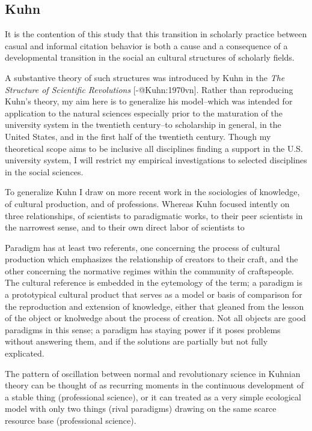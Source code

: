 \documentclass [PhD] {uclathes}
\begin{document}
\subsection{Kuhn}\label{kuhn}

It is the contention of this study that this transition in scholarly
practice between casual and informal citation behavior is both a cause
and a consequence of a developmental transition in the social an
cultural structures of scholarly fields.

A substantive theory of such structures was introduced by Kuhn in the
\emph{The Structure of Scientific Revolutions} {[}-@Kuhn:1970vn{]}.
Rather than reproducing Kuhn's theory, my aim here is to generalize his
model--which was intended for application to the natural sciences
especially prior to the maturation of the university system in the
twentieth century--to scholarship in general, in the United States, and
in the first half of the twentieth century. Though my theoretical scope
aims to be inclusive all disciplines finding a support in the U.S.
university system, I will restrict my empirical investigations to
selected disciplines in the social sciences.

To generalize Kuhn I draw on more recent work in the sociologies of
knowledge, of cultural production, and of professions. Whereas Kuhn
focused intently on three relationships, of scientists to paradigmatic
works, to their peer scientists in the narrowest sense, and to their own
direct labor of scientists to

Paradigm has at least two referents, one concerning the process of
cultural production which emphasizes the relationship of creators to
their craft, and the other concerning the normative regimes within the
community of craftspeople. The cultural reference is embedded in the
eytemology of the term; a paradigm is a prototypical cultural product
that serves as a model or basis of comparison for the reproduction and
extension of knowledge, either that gleaned from the lesson of the
object or knolwedge about the process of creation. Not all objects are
good paradigms in this sense; a paradigm has staying power if it poses
problems without answering them, and if the solutions are partially but
not fully explicated.

The pattern of oscillation between normal and revolutionary science in
Kuhnian theory can be thought of as recurring moments in the continuous
development of a stable thing (professional science), or it can treated
as a very simple ecological model with only two things (rival paradigms)
drawing on the same scarce resource base (professional science).
\end{document}
